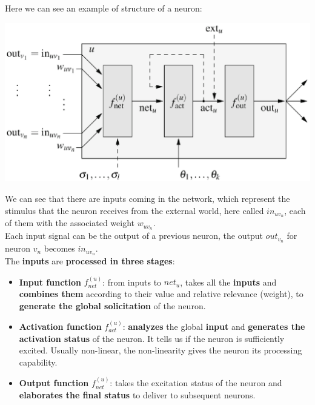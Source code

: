 Here we can see an example of structure of a neuron:
\begin{center}
	\includegraphics[width=0.9\columnwidth]{img/NN/neuron1}
\end{center}

\newpage

We can see that there are inputs coming in the network, which represent the stimulus that the neuron receives from the external world, here called $in_{uv_n}$, each of them with the associated weight $w_{uv_n}$.\\

Each input signal can be the output of a previous neuron, the output $out_{v_n}$ for neuron $v_n$ becomes $in_{uv_n}$.\\

The \textbf{inputs} are \textbf{processed in three stages}: 
\begin{itemize}
	\item \textbf{Input function} $f^{(u)}_{net}$: from inputs to $net_u$, takes all the \textbf{inputs} and \textbf{combines them} according to their value and relative relevance (weight), to \textbf{generate the global solicitation} of the neuron.\\
	
	\item \textbf{Activation function} $f^{(u)}_{act}$: \textbf{analyzes} the global \textbf{input} and \textbf{generates the activation status} of the neuron. It tells us if the neuron is sufficiently excited. Usually non-linear, the non-linearity gives the neuron its processing capability.\\
	
	\item \textbf{Output function} $f^{(u)}_{net}$: takes the excitation status of the neuron and \textbf{elaborates the final status} to deliver to subsequent neurons.\\
	
\end{itemize}

